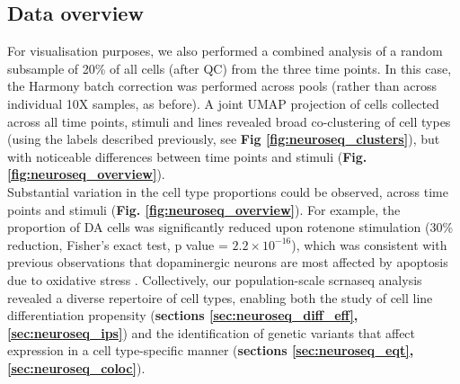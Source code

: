 



\newpage

\subsection{Data overview}

For visualisation purposes, we also performed a combined analysis of a random subsample of 20\% of all cells (after QC) from the three time points.
In this case, the Harmony batch correction was performed across pools (rather than across individual 10X samples, as before).
A joint UMAP projection of cells collected across all time points, stimuli and lines revealed broad co-clustering of cell types (using the labels described previously, see \textbf{Fig \ref{fig:neuroseq_clusters}}), but with noticeable differences between time points and stimuli (\textbf{Fig. \ref{fig:neuroseq_overview}}). \\

Substantial variation in the cell type proportions could be observed, across time points and stimuli (\textbf{Fig. \ref{fig:neuroseq_overview}}). 
For example, the proportion of DA cells was significantly reduced upon rotenone stimulation (30\% reduction, Fisher’s exact test, p value = $2.2 \times 10^{-16}$), which was consistent with previous observations that dopaminergic neurons are most affected by apoptosis due to oxidative stress \cite{sherer2003mechanism, knonagel1992autologous, cannon2009highly}.
Collectively, our population-scale \gls{scrnaseq} analysis revealed a diverse repertoire of cell types, enabling both the study of cell line differentiation propensity (\textbf{sections \ref{sec:neuroseq_diff_eff}, \ref{sec:neuroseq_ips}}) and the identification of genetic variants that affect expression in a cell type-specific manner (\textbf{sections \ref{sec:neuroseq_eqt}, \ref{sec:neuroseq_coloc}}). 
\\ 

